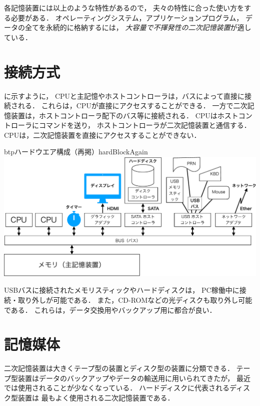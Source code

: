各記憶装置には以上のような特性があるので，
夫々の特性に合った使い方をする必要がある．
オペレーティングシステム，アプリケーションプログラム，
データの全てを永続的に格納するには，
\emph{大容量で不揮発性の二次記憶装置}が適している．

\section{接続方式}
に示すように，
CPUと主記憶やホストコントローラは，バスによって直接に接続される．
これらは，CPUが直接にアクセスすることができる．
一方で二次記憶装置は，ホストコントローラ配下のバス等に接続される．
CPUはホストコントローラにコマンドを送り，
ホストコントローラが二次記憶装置と通信する．
CPUは，二次記憶装置を直接にアクセスすることができない．

\begin{myfig}{btp}{ハードウエア構成（再掲）}{hardBlockAgain}
  \includegraphics[scale=0.55]{Fig/hardBlock-crop.pdf}
\end{myfig}

USBバスに接続されたメモリスティックやハードディスクは，
PC稼働中に接続・取り外しが可能である．
また，CD-ROMなどの光ディスクも取り外し可能である．
これらは，データ交換用やバックアップ用に都合が良い．

\section{記憶媒体}
二次記憶装置は大きくテープ型の装置とディスク型の装置に分類できる．
テープ型装置はデータのバックアップやデータの輸送用に用いられてきたが，
最近では使用されることが少なくなっている．
ハードディスクに代表されるディスク型装置は
最もよく使用される二次記憶装置である．

